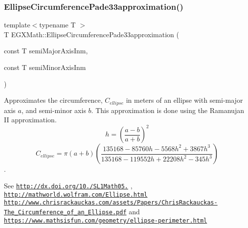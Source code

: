 \mbox{\label{group___e_g_x_math-_geometry-2_d-_ellipse-_circumference_ga0e0b290f1da2605c16ec13b9e221769d}} 
\subsubsection{\texorpdfstring{Ellipse\+Circumference\+Pade33approximation()}{EllipseCircumferencePade33approximation()}}
{\footnotesize\ttfamily template$<$typename T $>$ \\
T E\+G\+X\+Math\+::\+Ellipse\+Circumference\+Pade33approximation (\begin{DoxyParamCaption}\item[{const T}]{semi\+Major\+Axis\+Inm,  }\item[{const T}]{semi\+Minor\+Axis\+Inm }\end{DoxyParamCaption})}



Approximates the circumference, $C_{ellipse}$ in meters of an ellipse with semi-\/major axis $a$, and semi-\/minor axis $b$. This approximation is done using the Ramanujan II approximation. \[ h=\left( \frac{a-b}{a+b} \right)^2 \] \[ C_{ellipse}=\pi (a + b) \left( \frac{135168-85760 h-5568 h^2+ 3867 h^3}{135168-119552 h+ 22208 h^2 - 345h^3} \right) \]. 

See \href{http://dx.doi.org/10.3247/SL1Math05.004}{\tt http\+://dx.\+doi.\+org/10./\+S\+L1\+Math05.} , \href{http://mathworld.wolfram.com/Ellipse.html}{\tt http\+://mathworld.\+wolfram.\+com/\+Ellipse.\+html} \href{http://www.chrisrackauckas.com/assets/Papers/ChrisRackauckas-The_Circumference_of_an_Ellipse.pdf}{\tt http\+://www.\+chrisrackauckas.\+com/assets/\+Papers/\+Chris\+Rackauckas-\/\+The\+\_\+\+Circumference\+\_\+of\+\_\+an\+\_\+\+Ellipse.\+pdf} and \href{https://www.mathsisfun.com/geometry/ellipse-perimeter.html}{\tt https\+://www.\+mathsisfun.\+com/geometry/ellipse-\/perimeter.\+html}

